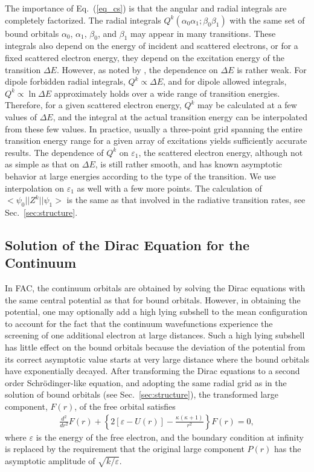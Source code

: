 The importance of Eq.~(\ref{eq_cs}) is that the angular and radial integrals
are completely factorized. The radial integrals
$Q^k(\alpha_0\alpha_1;\beta_0\beta_1)$ with the same set of bound orbitals
$\alpha_0$, $\alpha_1$, $\beta_0$, and $\beta_1$ may appear in many
transitions. These integrals also depend on the energy of incident
and scattered electrons, or for a fixed scattered electron energy, they depend
on the excitation energy of the transition $\Delta E$. However, as noted by
\citet{barshalom:1988a}, the dependence on $\Delta E$  is rather weak. For
dipole forbidden radial integrals, $Q^k \propto \Delta E$, and for dipole
allowed integrals, $Q^k \propto \ln\Delta E$ approximately holds over a wide
range of transition energies. Therefore, for a given scattered electron energy,
$Q^k$ may be calculated at a few values of $\Delta E$, and the integral at the
actual transition energy can be interpolated from these few values. In
practice, 
usually a three-point grid spanning the entire transition energy range for
a given array of excitations yields sufficiently accurate results. The
dependence of $Q^k$ on $\varepsilon_1$, the scattered electron energy,
although not as simple as that on $\Delta E$, is still rather smooth, and has
known asymptotic behavior at large energies according to the type of the
transition. We use interpolation on $\varepsilon_1$ as well with a few more
points. The calculation of $<\psi_0||Z^k||\psi_1>$ is the same as that
involved in the radiative transition rates, see Sec.~\ref{sec:structure}.

\subsection{Solution of the Dirac Equation for the Continuum}
In FAC, the continuum orbitals are obtained by solving the Dirac equations with
the same central potential as that for bound orbitals. However, in obtaining the
potential, one may optionally add a high lying subshell to the mean
configuration to account for the fact that the continuum  wavefunctions
experience the screening of one additional electron at large distances. Such a
high  lying subshell has little effect on the bound orbitals because the
deviation of the potential from its correct asymptotic value starts at very
large distance where the bound orbitals have exponentially decayed.  After
transforming the Dirac equations to a second order Schr\"{o}dinger-like
equation, and adopting the same radial grid as in the solution of bound orbitals
(see Sec.~\ref{sec:structure}), the transformed large component, $F(r)$,  of the
free orbital satisfies 
\begin{eqnarray}
\label{eq_schrodinger2}
\frac{d^2}{d r^2}F(r) + \left\{2\left[\varepsilon-U(r)\right] - 
\frac{\kappa(\kappa + 1)}{r^2}\right\}F(r) = 0,
\end{eqnarray}
where $\varepsilon$ is the energy of the free electron, and the boundary
condition at infinity is replaced by the requirement that the
original large component $P(r)$  has the asymptotic amplitude of
$\sqrt{k/\varepsilon}$.  

